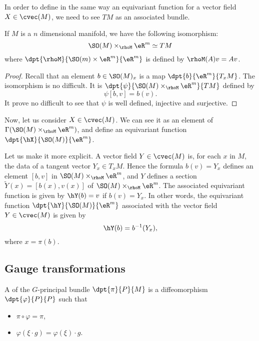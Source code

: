 			In order to define in the same way an equivariant function for a vector field $X\in\cvec(M)$, we need to see $TM$ as an associated bundle.

			\begin{proposition}
			If $M$ is a $n$ dimensional manifold, we have the following isomorphism:
			\[
				\SO(M)\times_{\rhoM}\eR^m\simeq TM
				\]
				where $\dpt{\rhoM}{\SO(m)\times\eR^m}{\eR^m}$ is defined by $\rhoM(A)v=Av$.
				\end{proposition}
				\begin{proof}
				Recall that an element $b\in \SO(M)_x$ is a map $\dpt{b}{\eR^m}{T_xM}$. The isomorphism is no difficult. It is $\dpt{\psi}{\SO(M)\times_{\rhoM}\eR^m}{TM}$ defined by
				\[\psi[b,v]=b(v).\]
				It prove no difficult to see that $\psi$ is well defined, injective and surjective.
				\end{proof}

				Now, let us consider $X\in\cvec(M)$. We can see it as an element of $\Gamma(\SO(M)\times_{\rhoM}\eR^m)$, and define an equivariant function $\dpt{\hX}{\SO(M)}{\eR^m}$.

				Let us make it more explicit. A vector field $Y\in\cvec(M)$ is, for each $x$ in $M$, the data of a tangent vector $Y_x\in T_xM$. Hence the formula $b(v)=Y_x$ defines an element $[b,v]$ in $\SO(M)\times_{\rhoM}\eR^m$, and $Y$ defines a section $\tilde{Y}(x)=[b(x),v(x)]$ of $\SO(M)\times_{\rhoM}\eR^m$. The associated equivariant function is given by $\hY(b)=v$ if $b(v)=Y_x$. In other words, the equivariant function $\dpt{\hY}{\SO(M)}{\eR^m}$ associated with the vector field $Y\in\cvec(M)$ is given by
				\begin{equation}\label{r1404e1}
				\hY(b)=b^{-1}(Y_x),
				\end{equation}
				where $x=\pi(b)$.


				\subsection{Gauge transformations}

				A  of the $G$-principal bundle $\dpt{\pi}{P}{M}$ is a diffeomorphism $\dpt{\varphi}{P}{P}$ such that

				\begin{itemize}
				\item $\pi\circ\varphi=\pi$,
				\item  $\varphi(\xi\cdot g)=\varphi(\xi)\cdot g$.
				\end{itemize}

